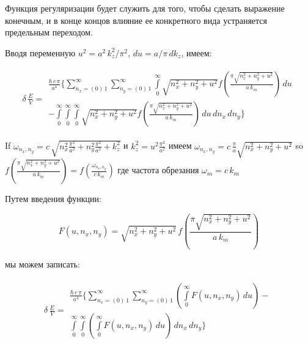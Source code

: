 \documentclass[11pt]{article}
\begin{document}
    Функция регуляризации будет служить для того, чтобы сделать выражение
конечным, и в конце концов влияние ее конкретного вида устраняется
предельным переходом.

    Вводя переменную \(u^2 = a^2\,k_z^2/\pi^2\), \(du = a/\pi\,dk_z\),
имеем:

    \begin{equation}
\begin{array}{lr}
\delta\,\frac{E}{V} =
\begin{array}{c}
\frac{\hbar\,c\,\pi}{a^4}\Bigg\{
\sum\limits_{n_x=\left(0\right)\,1}^{\infty}
\sum\limits_{n_y=\left(0\right)\,1}^{\infty}
\int\limits_{0}^{\infty}
{\sqrt{n_x^2 + n_y^2 + u^2}}
f\left(\frac{\pi\sqrt{n_x^2 + n_y^2 + u^2}}{a\,k_m}\right)
\,d{u} \\
- \int\limits_{0}^{\infty}
\int\limits_{0}^{\infty}
\int\limits_{0}^{\infty}
{\sqrt{n_x^2 + n_y^2 + u^2}}
f\left(\frac{\pi\sqrt{n_x^2 + n_y^2 + u^2}}{a\,k_m}\right)
\,d{u}\,d{n_x}\,d{n_y}
\Bigg\}
\end{array}
\end{array}
\end{equation}

    If
\(\omega _{n_x,n_y} = c\,\sqrt{n_x^2\frac{\pi^2}{a^2}+n_y^2\frac{\pi^2}{a^2}+k_z^2}\)
и \(k_z^2 = u^2 \frac{\pi^2}{a^2}\) имеем
\(\omega _{n_x,n_y} = c \, \frac{\pi}{a} \sqrt{n_x^2+n_y^2+u^2}\) so
\(f\left(\frac{\pi\sqrt{n_x^2 + n_y^2+u^2}}{a\,k_m}\right) = f\left(\frac{\omega _{n_x,n_y}}{c\,k_m}\right)\)
где частота обрезания \(\omega_m = c\,k_m\)

    Путем введения функции:

    \begin{equation}
F\left(u, n_x, n_y\right) = 
\sqrt{n_x^2 + n_y^2+u^2}\,
f\left(\frac{\pi\sqrt{n_x^2 + n_y^2+u^2}}{a\,k_m}\right)
\end{equation}

    мы можем записать:

    \begin{equation}
\begin{array}{lr}
\delta\,\frac{E}{V} =
\begin{array}{c}
\frac{\hbar\,c\,\pi}{a^4}
\Bigg\{
\sum\limits_{n_x=\left(0\right)\,1}^{\infty}
\sum\limits_{n_y=\left(0\right)\,1}^{\infty}
\left(\int\limits_{0}^{\infty}F\left(u, n_x, n_y\right)\,d{u}\right)
- \\
\int\limits_{0}^{\infty}
\int\limits_{0}^{\infty}
\left(\int\limits_{0}^{\infty}F\left(u, n_x, n_y\right)\,d{u}\right)
\,d{n_x}\,d{n_y}
\Bigg\}
\end{array}
\end{array}
\end{equation}
\end{document}
